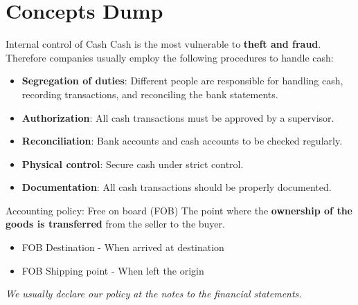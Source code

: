 \section{Concepts Dump}

\begin{theorem}
    {Internal control of Cash}
    Cash is the most vulnerable to \textbf{theft and fraud}. Therefore companies usually employ the following procedures to handle cash:
    \begin{itemize}
        \item \textbf{Segregation of duties}: Different people are responsible for handling cash, recording transactions, and reconciling the bank statements.
        \item \textbf{Authorization}: All cash transactions must be approved by a supervisor.
        \item \textbf{Reconciliation}: Bank accounts and cash accounts to be checked regularly.
        \item \textbf{Physical control}: Secure cash under strict control.
        \item \textbf{Documentation}: All cash transactions should be properly documented.
    \end{itemize}
\end{theorem}

\begin{theorem}
    {Accounting policy: Free on board (FOB)}
    The point where the \textbf{ownership of the goods is transferred} from the seller to the buyer.
    \begin{itemize}
        \item FOB Destination - When arrived at destination
        \item FOB Shipping point - When left the origin
    \end{itemize}
    \textit{We usually declare our policy at the notes to the financial statements.}
\end{theorem}